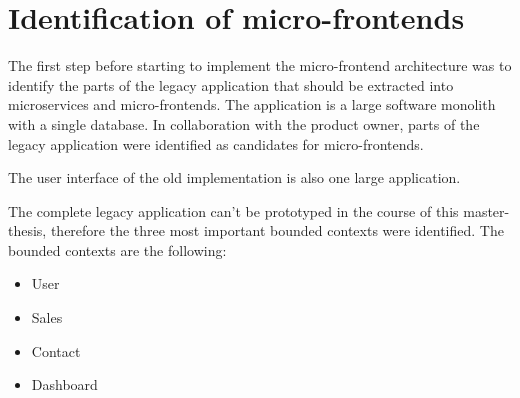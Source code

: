 \section{Identification of micro-frontends}\label{section:applied-methods:identification-micro-frontends}

The first step before starting to implement the micro-frontend architecture was to identify the parts of the legacy application that should be extracted into microservices and micro-frontends. The application is a large software monolith with a single database. In collaboration with the product owner, parts of the legacy application were identified as candidates for micro-frontends. 

The user interface of the old implementation is also one large application.

\bigskip

\noindent The complete legacy application can't be prototyped in the course of this master-thesis, therefore the three most important bounded contexts were identified. The bounded contexts are the following:

\begin{itemize}
  \item User
  \item Sales
  \item Contact
  \item Dashboard
\end{itemize}